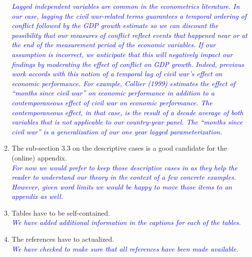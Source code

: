 \begin{enumerate}
\textcolor{blue}{\emph{
	Lagged independent variables are common in the econometrics literature. In our case, lagging the civil war-related terms guarantees a temporal ordering of conflict followed by the GDP growth estimate so we can discount the possibility that our measures of conflict reflect events that happened near or at the end of the measurement period of the economic variables. If our assumption is incorrect, we anticipate that this will negatively impact our findings by moderating the effect of conflict on GDP growth. Indeed, previous work accords with this notion of a temporal lag of civil war's effect on economic performance. For example, Collier (1999) estimates the effect of ``months since civil war'' on economic performance in addition to a contemporaneous effect of civil war on economic performance. The contemporaneous effect, in that case, is the result of a decade average of both variables that is not applicable to our country-year panel. The ``months since civil war'' is a generalization of our one year lagged parameterization.
}} \\

\item The sub-section 3.3 on the descriptive cases is a good candidate for the (online) appendix. \\

\textcolor{blue}{\emph{
	For now we would prefer to keep those descriptive cases in as they help the reader to understand our theory in the context of a few concrete examples. However, given word limits we would be happy to move those items to an appendix as well. 
}} \\

\item Tables have to be self-contained. \\

\textcolor{blue}{\emph{
	We have added additional information in the captions for each of the tables.
}} \\

\item The references have to actualized. \\

\textcolor{blue}{\emph{
	We have checked to make sure that all references have been made available.
}} \\

\end{enumerate}